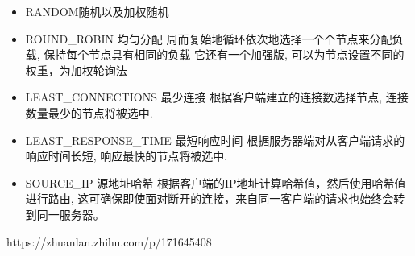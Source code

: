 \documentclass[../../../interview-questions.tex]{subfiles}
\begin{document}
\begin{itemize}
    \item{RANDOM随机以及加权随机}
    \item{ROUND\_ROBIN 均匀分配
    周而复始地循环依次地选择一个个节点来分配负载, 保持每个节点具有相同的负载
    它还有一个加强版, 可以为节点设置不同的权重，为加权轮询法}
    \item {LEAST\_CONNECTIONS 最少连接
    根据客户端建立的连接数选择节点, 连接数量最少的节点将被选中.}
    \item {LEAST\_RESPONSE\_TIME 最短响应时间
    根据服务器端对从客户端请求的响应时间长短, 响应最快的节点将被选中.}
    \item {SOURCE\_IP 源地址哈希
    根据客户端的IP地址计算哈希值，然后使用哈希值进行路由, 这可确保即使面对断开的连接，来自同一客户端的请求也始终会转到同一服务器。}
\end{itemize}

https://zhuanlan.zhihu.com/p/171645408
\end{document}
